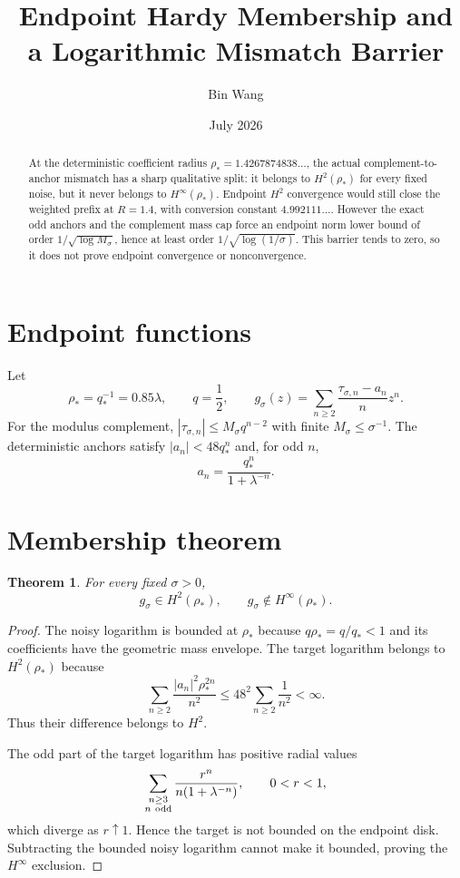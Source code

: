 \documentclass[11pt]{article}
\title{Endpoint Hardy Membership and a Logarithmic Mismatch Barrier}
\author{Bin Wang}\date{July 2026}
\newtheorem{theorem}{Theorem}[section]
\theoremstyle{remark}\newtheorem{remark}[theorem]{Remark}
\begin{document}
\maketitle
\begin{abstract}
At the deterministic coefficient radius
$\rho_*=1.4267874838\ldots$, the actual complement-to-anchor mismatch has a
sharp qualitative split: it belongs to $H^2(\rho_*)$ for every fixed noise,
but it never belongs to $H^\infty(\rho_*)$.  Endpoint $H^2$ convergence would
still close the weighted prefix at $R=1.4$, with conversion constant
$4.992111\ldots$.  However the exact odd anchors and the complement mass cap
force an endpoint norm lower bound of order $1/\sqrt{\log M_\sigma}$, hence
at least order $1/\sqrt{\log(1/\sigma)}$.  This barrier tends to zero, so it
does not prove endpoint convergence or nonconvergence.
\end{abstract}

\section{Endpoint functions}
Let
\[
 \rho_*=q_*^{-1}=0.85\lambda,\qquad q=\frac12,\qquad
 g_\sigma(z)=\sum_{n\ge2}
 \frac{\tau_{\sigma,n}-a_n}{n}z^n.
\]
For the modulus complement,
$|\tau_{\sigma,n}|\le M_\sigma q^{n-2}$ with finite
$M_\sigma\le\sigma^{-1}$.  The deterministic anchors satisfy
$|a_n|<48q_*^n$ and, for odd $n$,
\[
 a_n=\frac{q_*^n}{1+\lambda^{-n}}.
\]

\section{Membership theorem}
\begin{theorem}\label{thm:membership}
For every fixed $\sigma>0$,
\[
 g_\sigma\in H^2(\rho_*),\qquad
 g_\sigma\notin H^\infty(\rho_*).
\]
\end{theorem}
\begin{proof}
The noisy logarithm is bounded at $\rho_*$ because
$q\rho_*=q/q_*<1$ and its coefficients have the geometric mass envelope.
The target logarithm belongs to $H^2(\rho_*)$ because
\[
 \sum_{n\ge2}\frac{|a_n|^2\rho_*^{2n}}{n^2}
 \le48^2\sum_{n\ge2}\frac1{n^2}<\infty.
\]
Thus their difference belongs to $H^2$.

The odd part of the target logarithm has positive radial values
\[
 \sum_{\substack{n\ge3\\n\ {\rm odd}}}
 \frac{r^n}{n(1+\lambda^{-n})},\qquad 0<r<1,
\]
which diverge as $r\uparrow1$.  Hence the target is not bounded on the
endpoint disk.  Subtracting the bounded noisy logarithm cannot make it
bounded, proving the $H^\infty$ exclusion.
\end{proof}
\end{document}
